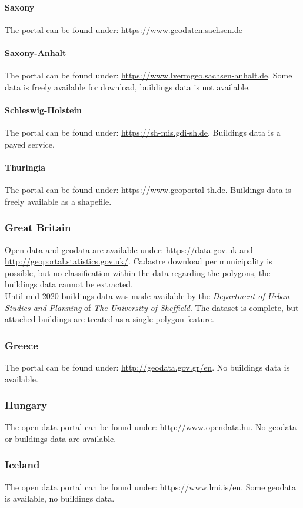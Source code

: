 \documentclass[final, 3p, times, 12pt]{elsarticle} %
\begin{document}
\paragraph{Saxony}
The portal can be found under: \url{https://www.geodaten.sachsen.de}
\paragraph{Saxony-Anhalt}
The portal can be found under: \url{https://www.lvermgeo.sachsen-anhalt.de}. Some data is freely available for download, buildings data is not available.
\paragraph{Schleswig-Holstein}
The portal can be found under: \url{https://sh-mis.gdi-sh.de}. Buildings data is a payed service.
\paragraph{Thuringia}
The portal can be found under: \url{https://www.geoportal-th.de}. Buildings data is freely available as a shapefile.
\subsubsection{Great Britain}
Open data and geodata are available under: \url{https://data.gov.uk} and \url{http://geoportal.statistics.gov.uk/}. Cadastre download per municipality is possible, but no classification within the data regarding the polygons, the buildings data cannot be extracted.\\
Until mid 2020 buildings data was made available by the \emph{Department of Urban Studies and Planning} of \emph{The University of Sheffield}. The dataset is complete, but attached buildings are treated as a single polygon feature.
\subsubsection{Greece}
The portal can be found under: \url{http://geodata.gov.gr/en}. No buildings data is available.
\subsubsection{Hungary}
The open data portal can be found under: \url{http://www.opendata.hu}. No geodata or buildings data are available.
\subsubsection{Iceland}
The open data portal can be found under: \url{https://www.lmi.is/en}. Some geodata is available, no buildings data.
\end{document}

